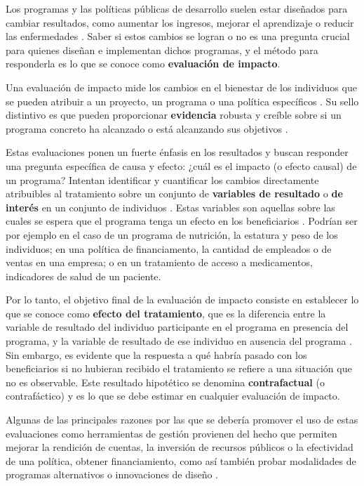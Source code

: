 \documentclass[../../main.tex]{subfiles}
\begin{document}
Los programas y las políticas públicas de desarrollo suelen estar diseñados para cambiar
resultados, como aumentar los ingresos, mejorar el aprendizaje o reducir las enfermedades
\cite{gertler-2016}. Saber si estos cambios se logran o no es una pregunta crucial para
quienes diseñan e implementan dichos programas, y el método para responderla es lo que se
conoce como \textbf{evaluación de impacto}.

Una evaluación de impacto mide los cambios en el bienestar de los individuos que se pueden
atribuir a un proyecto, un programa o una política específicos \cite{gertler-2016}. Su
sello distintivo es que pueden proporcionar \textbf{evidencia} robusta y creíble
sobre si un programa concreto ha alcanzado o está alcanzando sus objetivos
\cite{gertler-2016}.

Estas evaluaciones ponen un fuerte énfasis en los resultados y buscan responder una
pregunta específica de causa y efecto: ¿cuál es el impacto (o efecto causal) de un
programa? Intentan identificar y cuantificar los cambios directamente atribuibles al
tratamiento \cite{gertler-2016} sobre un conjunto de \textbf{variables de resultado} o
\textbf{de interés} en un conjunto de individuos \cite{bernal}. Estas variables son
aquellas sobre las cuales se espera que el programa tenga un efecto en los beneficiarios
\cite{bernal}. Podrían ser por ejemplo en el caso de un programa de nutrición, la estatura
y peso de los individuos; en una política de financiamento, la cantidad de empleados o de
ventas en una empresa; o en un tratamiento de acceso a medicamentos, indicadores de salud
de un paciente.

Por lo tanto, el objetivo final de la evaluación de impacto consiste en establecer lo que
se conoce como \textbf{efecto del tratamiento}, que es la diferencia entre la variable de
resultado del individuo participante en el programa en presencia del programa, y la
variable de resultado de ese individuo en ausencia del programa \cite{bernal}. Sin
embargo, es evidente que la respuesta a qué habría pasado con los beneficiarios si no
hubieran recibido el tratamiento se refiere a una situación que no es observable. Este
resultado hipotético se denomina \textbf{contrafactual} (o contrafáctico) y es lo que se
debe estimar en cualquier evaluación de impacto.

Algunas de las principales razones por las que se debería promover el uso de estas
evaluaciones como herramientas de gestión provienen del hecho que permiten mejorar la
rendición de cuentas, la inversión de recursos públicos o la efectividad de una política,
obtener financiamiento, como así también probar modalidades de programas alternativos o
innovaciones de diseño \cite{gertler-2016}.
\end{document}

